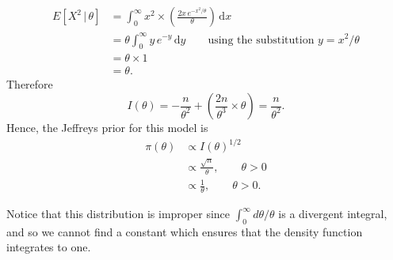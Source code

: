 {{}

\clearpage

{
    
        \begin{align*}
        E\left[X^2 \,| \, \theta\right]
        &=\int_0^\infty x^2\times
        \left(\frac{2x\,e^{-x^2/\theta}}{\theta}\right)\, \mathrm{d}x \\
        &=\theta\int_0^\infty y\,e^{-y}\,\mathrm{d}y 
        \quad\quad\text{using the substitution } y=x^2/\theta \\
        &=\theta\times 1 \\
        &=\theta.
        \end{align*}
        Therefore
        $$
        I(\theta)
        =-\frac{n}{\theta^2}+\left(\frac{2n}{\theta^3}\times\theta\right) 
        =\frac{n}{\theta^2}.
        $$
        Hence, the Jeffreys prior for this model is
        \begin{align*}
        \pi(\theta)&\propto I(\theta)^{1/2} \\
        &\propto \frac{\sqrt{n}}{\theta},\quad\quad\theta>0 \\
        &\propto \frac{1}{\theta},\quad\quad\theta>0.
        \end{align*}
        
    
}


Notice that this distribution is improper since $\int_0^\infty d\theta/\theta$ is a divergent integral, and so we cannot find a constant which ensures that the density function integrates to one.}

\clearpage

